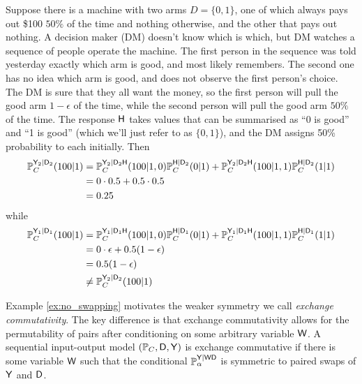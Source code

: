 \begin{example}\label{ex:no_swapping}
Suppose there is a machine with two arms $D=\{0,1\}$, one of which always pays out \$100 $50\%$ of the time and nothing otherwise, and the other that pays out nothing. A decision maker (DM) doesn't know which is which, but DM watches a sequence of people operate the machine. The first person in the sequence was told yesterday exactly which arm is good, and most likely remembers. The second one has no idea which arm is good, and does not observe the first person's choice. The DM is sure that they all want the money, so the first person will pull the good arm $1-\epsilon$ of the time, while the second person will pull the good arm $50\%$ of the time. The response $\mathsf{H}$ takes values that can be summarised as ``0 is good'' and ``1 is good'' (which we'll just refer to as $\{0,1\}$), and the DM assigns 50\% probability to each initially. Then
\begin{align}
    \mathbb{P}_C^{\mathsf{Y}_2|\mathsf{D}_2}(100|1) &= \mathbb{P}_C^{\mathsf{Y}_2|\mathsf{D}_2\mathsf{H}}(100|1,0)\mathbb{P}_C^{\mathsf{H}|\mathsf{D}_2}(0|1) + \mathbb{P}_C^{\mathsf{Y}_2|\mathsf{D}_2\mathsf{H}}(100|1,1)\mathbb{P}_C^{\mathsf{H}|\mathsf{D}_2}(1|1)\\
    &= 0\cdot 0.5 + 0.5\cdot 0.5\\
    &= 0.25
\end{align}
while
\begin{align}
    \mathbb{P}_C^{\mathsf{Y}_1|\mathsf{D}_1}(100|1) &= \mathbb{P}_C^{\mathsf{Y}_1|\mathsf{D}_1\mathsf{H}}(100|1,0)\mathbb{P}_C^{\mathsf{H}|\mathsf{D}_1}(0|1) + \mathbb{P}_C^{\mathsf{Y}_1|\mathsf{D}_1\mathsf{H}}(100|1,1)\mathbb{P}_C^{\mathsf{H}|\mathsf{D}_1}(1|1)\\
    &= 0\cdot\epsilon + 0.5 (1-\epsilon)\\
    &= 0.5(1-\epsilon)\\
    &\neq \mathbb{P}_C^{\mathsf{Y}_2|\mathsf{D}_2}(100|1)
\end{align}

\end{example}

Example \ref{ex:no_swapping} motivates the weaker symmetry we call \emph{exchange commutativity}. The key difference is that exchange commutativity allows for the permutability of pairs after conditioning on some arbitrary variable $\mathsf{W}$. A sequential input-output model $(\mathbb{P}_C,\mathsf{D},\mathsf{Y})$ is exchange commutative if there is some variable $\mathsf{W}$ such that the conditional $\mathbb{P}_\alpha^{\mathsf{Y}|\mathsf{WD}}$ is symmetric to paired swaps of $\mathsf{Y}$ and $\mathsf{D}$.

